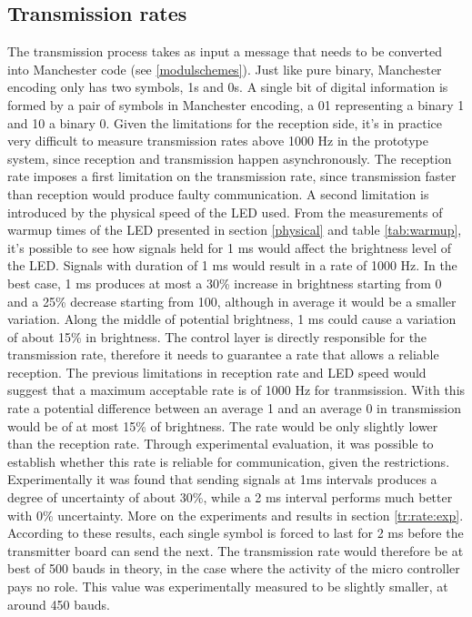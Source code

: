 \subsection{Transmission rates}
The transmission process takes as input a message that needs to be converted into Manchester code (see \ref{modulschemes}).
Just like pure binary, Manchester encoding only has two symbols, 1s and 0s.
A single bit of digital information is formed by a pair of symbols in Manchester encoding, a 01 representing a binary 1 and 10 a binary 0. 
Given the limitations for the reception side, it's in practice very difficult to measure transmission rates above 1000 Hz in the prototype system, since reception and transmission happen asynchronously.
The reception rate imposes a first limitation on the transmission rate, since transmission faster than reception would produce faulty communication.
A second limitation is introduced by the physical speed of the LED used.
From the measurements of warmup times of the LED presented in section \ref{physical} and table \ref{tab:warmup}, it's possible to see how signals held for 1 ms would affect the brightness level of the LED.
Signals with duration of 1 ms would result in a rate of 1000 Hz.
In the best case, 1 ms produces at most a 30\% increase in brightness starting from 0 and a 25\% decrease starting from 100, although in average it would be a smaller variation.
Along the middle of potential brightness, 1 ms could cause a variation of about 15\% in brightness.
The control layer is directly responsible for the transmission rate, therefore it needs to guarantee a rate that allows a reliable reception.
\newline
The previous limitations in reception rate and LED speed would suggest that a maximum acceptable rate is of 1000 Hz for tranmsission.
With this rate a potential difference between an average 1 and an average 0 in transmission would be of at most 15\% of brightness.
The rate would be only slightly lower than the reception rate.
Through experimental evaluation, it was possible to establish whether this rate is reliable for communication, given the restrictions.
\newline
Experimentally it was found that sending signals at 1ms intervals produces a degree of uncertainty of about 30\%, while a 2 ms interval performs much better with 0\% uncertainty.
More on the experiments and results in section \ref{tr:rate:exp}.
According to these results, each single symbol is forced to last for 2 ms before the transmitter board can send the next.
The transmission rate would therefore be at best of 500 bauds in theory, in the case where the activity of the micro controller pays no role.
This value was experimentally measured to be slightly smaller, at around 450 bauds. 

